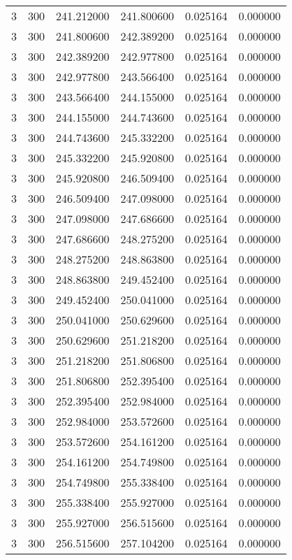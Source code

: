 \begin{longtable}{rrrrrr}
3 & 300 & 241.212000 & 241.800600 & 0.025164 & 0.000000 \\
3 & 300 & 241.800600 & 242.389200 & 0.025164 & 0.000000 \\
3 & 300 & 242.389200 & 242.977800 & 0.025164 & 0.000000 \\
3 & 300 & 242.977800 & 243.566400 & 0.025164 & 0.000000 \\
3 & 300 & 243.566400 & 244.155000 & 0.025164 & 0.000000 \\
3 & 300 & 244.155000 & 244.743600 & 0.025164 & 0.000000 \\
3 & 300 & 244.743600 & 245.332200 & 0.025164 & 0.000000 \\
3 & 300 & 245.332200 & 245.920800 & 0.025164 & 0.000000 \\
3 & 300 & 245.920800 & 246.509400 & 0.025164 & 0.000000 \\
3 & 300 & 246.509400 & 247.098000 & 0.025164 & 0.000000 \\
3 & 300 & 247.098000 & 247.686600 & 0.025164 & 0.000000 \\
3 & 300 & 247.686600 & 248.275200 & 0.025164 & 0.000000 \\
3 & 300 & 248.275200 & 248.863800 & 0.025164 & 0.000000 \\
3 & 300 & 248.863800 & 249.452400 & 0.025164 & 0.000000 \\
3 & 300 & 249.452400 & 250.041000 & 0.025164 & 0.000000 \\
3 & 300 & 250.041000 & 250.629600 & 0.025164 & 0.000000 \\
3 & 300 & 250.629600 & 251.218200 & 0.025164 & 0.000000 \\
3 & 300 & 251.218200 & 251.806800 & 0.025164 & 0.000000 \\
3 & 300 & 251.806800 & 252.395400 & 0.025164 & 0.000000 \\
3 & 300 & 252.395400 & 252.984000 & 0.025164 & 0.000000 \\
3 & 300 & 252.984000 & 253.572600 & 0.025164 & 0.000000 \\
3 & 300 & 253.572600 & 254.161200 & 0.025164 & 0.000000 \\
3 & 300 & 254.161200 & 254.749800 & 0.025164 & 0.000000 \\
3 & 300 & 254.749800 & 255.338400 & 0.025164 & 0.000000 \\
3 & 300 & 255.338400 & 255.927000 & 0.025164 & 0.000000 \\
3 & 300 & 255.927000 & 256.515600 & 0.025164 & 0.000000 \\
3 & 300 & 256.515600 & 257.104200 & 0.025164 & 0.000000 \\

\end{longtable}
